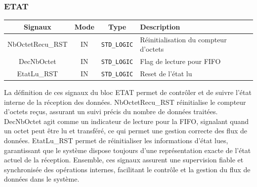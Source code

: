 \subsubsection*{ETAT}

\begin{center}
\renewcommand{\arraystretch}{1.2} %
\small %
    \begin{tabularx}{\textwidth}{|c||c|c|X|}
     \hline			
       \textbf{Signaux} & \textbf{Mode} & \textbf{Type} & \textbf{Description}  \\ \hline 
       NbOctetRecu\_RST & IN & \texttt{STD\_LOGIC} & Réinitialisation du compteur d'octets \\
       DecNbOctet & IN & \texttt{STD\_LOGIC} & Flag de lecture pour FIFO \\
       EtatLu\_RST & IN & \texttt{STD\_LOGIC} & Reset de l'état lu \\
     \hline  
    \end{tabularx}
\end{center}

La définition de ces signaux du bloc ETAT permet de contrôler et de suivre l'état interne de la 
réception des données. NbOctetRecu\_RST réinitialise le compteur d'octets reçus, assurant un 
suivi précis du nombre de données traitées. DecNbOctet agit comme un indicateur de lecture pour 
la FIFO, signalant quand un octet peut être lu et transféré, ce qui permet une gestion correcte 
des flux de données. EtatLu\_RST permet de réinitialiser les informations d'état lues, garantissant 
que le système dispose toujours d'une représentation exacte de l'état actuel de la réception. 
Ensemble, ces signaux assurent une supervision fiable et synchronisée des opérations internes, 
facilitant le contrôle et la gestion du flux de données dans le système.
